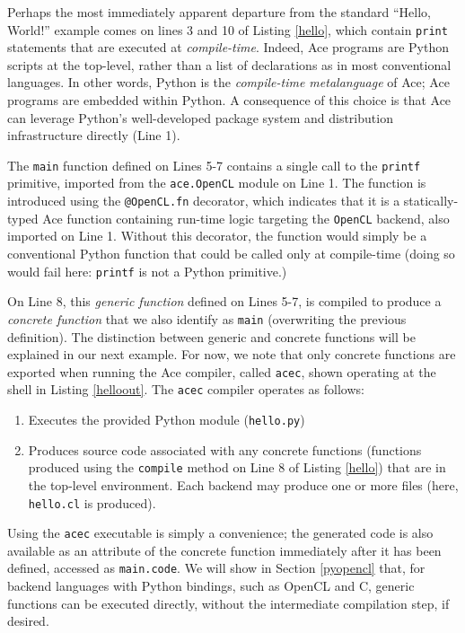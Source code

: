 \documentclass[10pt]{sigplanconf}
\begin{document}
Perhaps the most immediately apparent departure from the standard ``Hello, World!'' example comes on lines 3 and 10 of Listing \ref{hello}, which contain \verb|print| statements that are executed at {\em compile-time}. Indeed, Ace programs are Python scripts at the top-level, rather than a list of declarations as in most conventional languages. In other words, Python is the {\em compile-time metalanguage} of Ace; Ace programs are embedded within Python. A consequence of this choice is that Ace can leverage Python's well-developed package system and  distribution infrastructure directly (Line 1). 

The \verb|main| function defined on Lines 5-7 contains a single call to the \verb|printf| primitive, imported from the \verb|ace.OpenCL| module on Line 1. The function is introduced using the \verb|@OpenCL.fn| decorator, which indicates that it is a statically-typed Ace function containing run-time logic targeting the \verb|OpenCL| backend, also imported on Line 1. Without this decorator, the function would simply be a conventional Python function that could be called only at compile-time (doing so would fail here: \verb|printf| is not a Python primitive.)

On Line 8, this {\em generic function} defined on Lines 5-7, is compiled to produce a {\em concrete function} that we also identify as \verb|main| (overwriting the previous definition). The distinction between generic and concrete functions will be explained in our next example. For now, we note that only concrete functions are exported when running the Ace compiler, called \verb|acec|, shown operating at the shell in Listing \ref{helloout}. The \verb|acec| compiler operates as follows:
\begin{enumerate}
\item Executes the provided Python module (\verb|hello.py|)
\item Produces source code associated with any concrete functions (functions produced using the \verb|compile| method on Line 8 of Listing \ref{hello}) that are in the top-level environment. Each backend may produce one or more files (here, \verb|hello.cl| is produced).
\end{enumerate}

Using the \verb|acec| executable is simply a convenience; the generated code is also available as an attribute of the concrete function immediately after it has been defined, accessed as \verb|main.code|. We will show in Section \ref{pyopencl} that, for backend languages with Python bindings, such as OpenCL and C, generic functions can be executed directly, without the intermediate compilation step, if desired.
\end{document}
